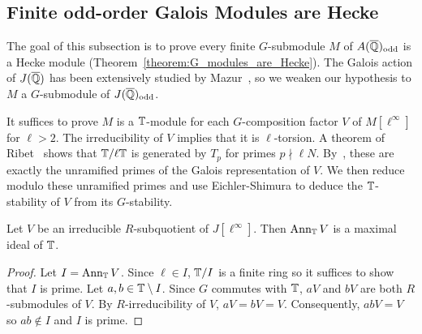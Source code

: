 \documentclass{article}
\newcommand{\odd}{\mathrm{odd}}
\begin{document}
\subsection{Finite odd-order Galois Modules are Hecke}%
\label{sub:finite_odd_order_galois_modules_are_hecke}

The goal of this subsection is to prove every finite $G$-submodule $M$ of
$A(\QQbar)_\odd$ is a Hecke module (Theorem~\ref{theorem:G_modules_are_Hecke}).
The Galois action of $J(\overline{\mathbb{Q}})$ has been extensively studied by
Mazur~\cite{mazur:eisenstein}, so we weaken our hypothesis to $M$ a
$G$-submodule of $J(\QQbar)_\odd$. 

It suffices to prove $M$ is a $\mathbb{T}$-module for each $G$-composition factor $V$
of $M[\ell^\infty]$ for $\ell>2$. The irreducibility of $V$ implies that it is
$\ell$-torsion. A theorem of Ribet~\cite[Proposition 2]{ribet:mult_p_finite}
shows that $\mathbb{T}/\ell \mathbb{T}$ is generated by $T_p$ for primes $p\nmid \ell N$.
By~\cite[\S 14]{mazur:eisenstein}, these are exactly the unramified primes of
the Galois representation of $V$. We then reduce modulo these unramified primes
and use Eichler-Shimura to deduce the $\mathbb{T}$-stability of $V$ from its
$G$-stability.

\begin{lemma}\label{lemma:cherry_street}
    Let $V$ be an irreducible $R$-subquotient of $J[\ell^\infty]$. Then
    $\operatorname{Ann}_{\mathbb{T}} V$ is a maximal ideal of $\mathbb{T}$.
\end{lemma}
\begin{proof}
    Let $I=\operatorname{Ann}_{\mathbb{T}} V$. Since $\ell\in I$, $\mathbb{T}/I$ is a finite ring so it
    suffices to show that $I$ is prime. Let $a,b\in \mathbb{T}\setminus I$. Since $G$
    commutes with $\mathbb{T}$, $aV$ and $bV$ are both $R$-submodules of $V$. By
    $R$-irreducibility of $V$, $aV=bV=V$. Consequently, $abV=V$ so $ab\notin I$
    and $I$ is prime.
\end{proof}
\end{document}
